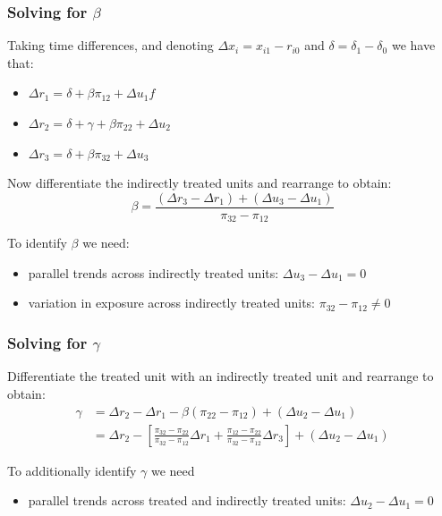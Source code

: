 \documentclass[aspectratio=169, t]{beamer}
\begin{document}
\begin{frame}
	\frametitle{Solving for $\beta$}

	Taking time differences, and denoting $\Delta x_i = x_{i1} - r_{i0}$ and $\delta = \delta_{1} - \delta_{0}$ we have that:

	\begin{itemize}
		\item $\Delta r_{1} = \delta + \beta\pi_{12} + \Delta u_{1}f$
		\item $\Delta r_{2} = \delta + \gamma + \beta\pi_{22} + \Delta u_{2}$
		\item $\Delta r_{3} = \delta + \beta\pi_{32} + \Delta u_{3}$
	\end{itemize}

	\pause
	\vspace{2mm}

	Now differentiate the indirectly treated units and rearrange to obtain:
	\[
	\beta = \frac{(\Delta r_{3} - \Delta r_{1}) + (\Delta u_{3} - \Delta u_{1})}{\pi_{32} - \pi_{12}}
	\]

	\vspace{2mm}
	To identify $\beta$ we need:
	\begin{itemize}
		\item parallel trends across indirectly treated units: $\Delta u_{3} - \Delta u_{1} = 0$
		\item variation in exposure across indirectly treated units:  $\pi_{32} - \pi_{12} \neq 0$
	\end{itemize}
\end{frame}

\begin{frame}
	\frametitle{Solving for $\gamma$}

	Differentiate the treated unit with an indirectly treated unit and rearrange to obtain:
	\[
	\begin{split}
	\gamma & = \Delta r_{2} - \Delta r_{1} - \beta(\pi_{22} - \pi_{12}) + (\Delta u_{2} - \Delta u_{1}) \\
		& = \Delta r_{2} - \left[\frac{\pi_{32} - \pi_{22}}{\pi_{32} - \pi_{12}}\Delta r_{1} + \frac{\pi_{12} - 
		\pi_{22}}{\pi_{32} - \pi_{12}}\Delta r_{3}\right] + (\Delta u_{2} - \Delta u_{1})
	\end{split}
	\]

	\vspace{2mm}
	To additionally identify $\gamma$ we need
	\begin{itemize}
		\item parallel trends across treated and indirectly treated units: $\Delta u_{2} - \Delta u_{1} = 0$
	\end{itemize}
\end{frame}
\end{document}
